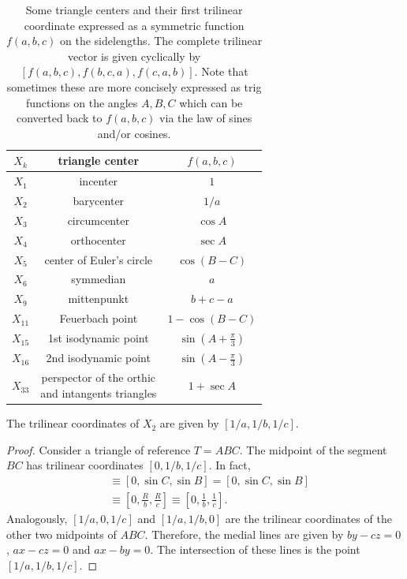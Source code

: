 \begin{table}[H]
    \centering
    \begin{tabular}{|c|c|c|}
    \hline
         $X_k $& triangle center& $f(a,b,c)$ \\
         \hline
     $X_1 $ & incenter & $ 1$ \\
     \hline
          $X_2 $ & barycenter  & ${1}/{a}$ \\
          \hline
              $X_3$ & circumcenter & $\cos A$ \\
              \hline 
              $ X_4$ & orthocenter & $\sec A$ \\
              \hline   
                $X_5$ & center of Euler's circle & $\cos(B - C)$ \\
              \hline  
                $X_6$ & symmedian & $a$ \\
              \hline  
              $X_9$ & mittenpunkt & $b + c - a$ \\
              \hline
                 $X_{11}$ &Feuerbach point  & $1 - \cos(B - C)$ \\
              \hline
               $X_{15}$ & 1st isodynamic point   & $\sin(A+\frac{\pi}{3})$ \\
              \hline
                $ X_{16} $ & 2nd isodynamic point   & $\sin(A-\frac{\pi}{3})$ \\
              \hline
               $X_{33}$ &  \makecell[cc]{perspector of the orthic\\and intangents triangles}  & $1 +\sec{A}$ \\
            \hline
    \end{tabular}
    \caption{Some triangle centers and their first trilinear coordinate expressed as a symmetric function $f(a,b,c)$ on the sidelengths. The complete trilinear vector is given cyclically by $[f(a,b,c),f(b,c,a),f(c,a,b)]$. Note that sometimes these are more concisely expressed as trig functions on the angles $A,B,C$ which can be converted back to $f(a,b,c)$ via the law of sines and/or cosines.}
    \label{tab:Xitrilinear}
\end{table}

\begin{proposition}
The trilinear coordinates of $X_2$ are given by $[1/a,1/b,1/c].$
\end{proposition}

\begin{proof}
Consider a triangle of reference $T=ABC$. The midpoint of the segment $BC$ has trilinear coordinates $[0,1/b,1/c].$
In fact,
\begin{align*}
    [0,\frac{a}{2}\sin C, \frac{a}{2}\sin B] &\equiv[0,\sin C,\sin B]=[0,\sin C,\sin B]\\
    &\equiv[0,\frac{R}{b},\frac{R}{c}]\equiv [0,\frac{1}{b},\frac{1}{c}].
\end{align*} 
Analogously, $[1/a,0,1/c]$ and $[1/a,1/b,0]$ are the trilinear coordinates of the other two midpoints of $ABC.$
Therefore, the medial lines are given by $by-cz=0$, $ax-cz=0$ and $ax-by=0$. The intersection of these lines is the point $[1/a,1/b,1/c].$
\end{proof}

